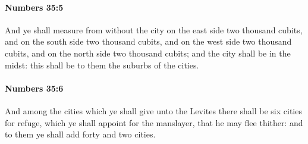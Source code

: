 		\paragraph{Numbers 35:5} %
			\label{NUMBERS-35-5}

			And ye shall measure from without the city on the east side two thousand cubits, and on the south side two thousand cubits, and on the west side two thousand cubits, and on the north side two thousand cubits; and the city shall be in the midst: this shall be to them the suburbs of the cities.


		\paragraph{Numbers 35:6} %
			\label{NUMBERS-35-6}

			And among the cities which ye shall give unto the Levites there shall be six cities for refuge, which ye shall appoint for the manslayer, that he may flee thither: and to them ye shall add forty and two cities.

